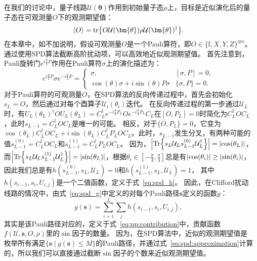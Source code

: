 在我们的讨论中，量子线路$\mathcal{U}(\bm{\theta})$作用到初始量子态$\rho$上，目标是近似演化后的量子态在可观测量$O$下的观测期望值：
\begin{equation}
    \langle O \rangle = \tr{O \mathcal{U}(\bm{\theta})\rho \mathcal{U}(\bm{\theta})^\dagger}.
\end{equation}
在本章中，如不加说明，假设可观测量$O$是一个Pauli算符，即$O\in \{\mathbb{I},X,Y,Z\}^{\otimes n}$。
通过使用SPD算法截断高阶扰动项，可以高效地近似观测期望值。
首先注意到，Pauli旋转门$e^{i\frac{\theta}{2} P}$作用在Pauli算符$\sigma$上的演化描述为：
\begin{equation}\label{eq:heisenberg}
  e^{i \frac{\theta}{2} P} \sigma e^{-i \frac{\theta}{2} P} = 
  \begin{cases}
  \sigma, & [\sigma,P] = 0, \\
  \cos(\theta) \sigma + i \sin(\theta) P\sigma & \{\sigma, P\} = 0.
  \end{cases} 
\end{equation}
对于Pauli算符的可观测量$O$，在SPD算法的反向传递过程中，首先会初始化$s_L=O$，然后通过对每个酉算子$\mathcal{U}_i(\theta_i)$迭代。
在反向传递过程的第一步通过$\mathcal{U}_L$时，有${U}_L(\theta_L)^{\dagger} O {U}_L(\theta_L)=C^\dagger_Le^{-i\frac{\theta}{2} P_L}Oe^{-i\frac{\theta}{2} P_L}C_L$在$[O,P_L]=0$时简化为$C_L^\dagger O C_L$，此时$s_{L-1}=C_L^\dagger O C_L$是唯一的可能。
相反，对于$\{O,P_L\} = 0$，它变为$\cos(\theta_L)C_L^\dagger O C_L + i\sin(\theta_L) C_L^\dagger P_L O C_L$。此时，$s_{L-1}$发生分叉，有两种可能的值$s_{L-1}^{(0)}=C_L^\dagger O C_L$和$s_{L-1}^{(1)}=C_L^\dagger P_L O C_L$。
因为，$\abs{\Tr{s_L \mathcal{U}_{L} s_{L-1}^{(0)} \mathcal{U}_{L}^\dagger}}=\abs{\cos(\theta_L)}$，而$\abs{\Tr{s_L \mathcal{U}_{L} s_{L-1}^{(1)} \mathcal{U}_{L}^\dagger}}=\abs{\sin(\theta_L)}$，根据$\theta_i\in [-\frac{\pi}{4},\frac{\pi}{4}]$总是有$\abs{\cos(\theta_i)}\geq \abs{\sin(\theta_i)}$，因此我们总是有$h(s_{L-1}^{(0)},s_L,\mathcal{U}_{L})=0$和$h(s_{L-1}^{(1)},s_L,\mathcal{U}_{L})=1$，
其中$h(s_{i-1},s_i,U_{i,j})$是一个二值函数，定义于式~\eqref{eq:spd_h}。
因此，在Clifford扰动线路的情况中，由式~\eqref{eq:spd_g}中定义的对每个Pauli路径$\bm{s}$定义的函数$g$：
\begin{equation}
    g(\bm{s})=\sum_{i=1}^{L}\sum_{j} h(s_{i-1},s_i,U_{i,j}),
\end{equation}
其实是该Pauli路径对应的，定义于式~\eqref{eq:pp:contribution}中，贡献函数$f(\mathcal{U},\bm{s},O,\rho)$里的$\sin$因子的数量。
因为，在SPD算法中，近似的观测期望值是枚举所有满足$\{\bm{s}\mid g(\bm{s})\leq M\}$的Pauli路径，并通过式~\eqref{eq:spd:approximation}计算的，所以我们可以直接通过截断$\sin$因子的个数来近似观测期望值。

